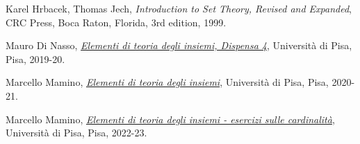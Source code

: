 \documentclass[11pt]{scrartcl}
\begin{document}
\pagebreak
\begin{thebibliography}{9}
	Karel Hrbacek, Thomas Jech,
	\textit{Introduction to Set Theory, Revised and Expanded},
	CRC Press, Boca Raton, Florida,
	3rd edition,
	1999.

	Mauro Di Nasso,
	\href{https://people.dm.unipi.it/dinasso/ETI/dispensa-04ss.pdf}{\textit{Elementi di teoria degli insiemi, Dispensa 4}},
	Università di Pisa, Pisa,
	2019-20.

	Marcello Mamino,
	\href{https://ciovil.li/eti20/}{\textit{Elementi di teoria degli insiemi}},
	Università di Pisa, Pisa,
	2020-21.

	Marcello Mamino,
	\href{https://ciovil.li/eti21/es-cardinalita.pdf}{\textit{Elementi di teoria degli insiemi - esercizi sulle cardinalità}},
	Università di Pisa, Pisa,
	2022-23.
\end{thebibliography}
\end{document}

